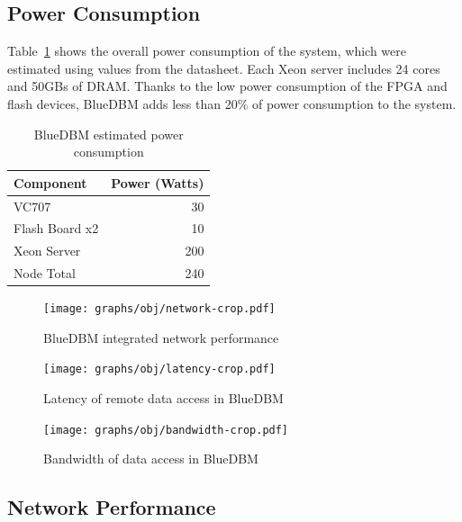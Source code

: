 \subsection{Power Consumption}
Table~\ref{tab:power} shows the overall power consumption of the system, which
were estimated using values from the datasheet. Each Xeon server includes 24
cores and 50GBs of DRAM.
Thanks to the low power
consumption of the FPGA and flash devices, BlueDBM adds less than 20\% of power
consumption to the system.

\begin{table}[h]\footnotesize
\centering
\begin{tabular}{l | r}
Component & Power (Watts) \\
\hline \hline
VC707 & 30 \\
Flash Board x2 & 10 \\
Xeon Server & 200 \\
\hline
Node Total & 240 \\

\end{tabular}
\caption{BlueDBM estimated power consumption}
\label{tab:power}
\end{table}

\begin{figure}[ht]
\centering
\vspace{0pt}
\begin{minipage}[c]{.3\textwidth}
	\texttt{[image: graphs/obj/network-crop.pdf]}
	\caption{BlueDBM integrated network performance}
	\label{fig:result_network}
\end{minipage}\hfill
\vspace{0pt}
\begin{minipage}[c]{.3\textwidth}
	\texttt{[image: graphs/obj/latency-crop.pdf]}
	\caption{Latency of remote data access in BlueDBM}
	\label{fig:result_latency}
\end{minipage}\hfill
\vspace{0pt}
\begin{minipage}[c]{.3\textwidth}
	\texttt{[image: graphs/obj/bandwidth-crop.pdf]}
	\caption{Bandwidth of data access in BlueDBM}
	\label{fig:result_bandwidth}
\end{minipage}
\end{figure}

\subsection{Network Performance}

